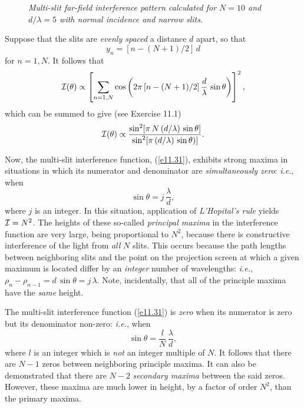 \begin{figure}
\epsfysize=2.5in
\centerline{}
\caption{\em Multi-slit  far-field interference pattern calculated for $N=10$ and $d/\lambda = 5$ with normal
incidence and narrow slits.}\label{f11.8}   
\end{figure}

Suppose that the slits are {\em evenly spaced}\/ a distance $d$ apart, so that
\begin{equation}
y_n = [n-(N+1)/2]\,d
\end{equation}
for $n=1,N$. It follows that
\begin{equation}
{\cal I}(\theta) \propto  \left[\sum_{n=1,N} \cos\left(2\pi\,[n-(N+1)/2]\,\frac{d}{\lambda}\,\sin\theta\right)\right]^2,
\end{equation}
which can be summed to give (see Exercise 11.1)
\begin{equation}\label{e11.31}
{\cal I}(\theta)\propto \frac{\sin^2[\pi\,N\,(d/\lambda)\,\sin\theta]}{\sin^2[\pi\,(d/\lambda)\,\sin\theta)]}.
\end{equation}

Now, the multi-slit interference function, (\ref{e11.31}), exhibits  strong maxima in situations in which
its numerator and  denominator are {\em simultaneously zero}: {\em i.e.}, when 
\begin{equation}\label{e11.31a}
\sin\theta=j\,\frac{\lambda}{d},
\end{equation}
 where
$j$ is an integer. In this situation, application of {\em L'Hopital's rule}\/ yields ${\cal I} = N^2$. The
heights of these so-called {\em principal maxima}\/ in the interference function are very large, being proportional to $N^2$, because  
 there is constructive
interference of the light from {\em all}\/ $N$ slits. This occurs because the path lengths between neighboring
slits and the point on the projection screen at which a given maximum is located differ by an {\em integer}\/ number of wavelengths: {\em i.e.},
$\rho_n-\rho_{n-1}=d\,\sin\theta=j\,\lambda$. Note, incidentally, that all of the principle maxima have the {\em same}\/ height. 

The multi-slit interference function (\ref{e11.31}) is  {\em zero}\/ when
its numerator is zero but its denominator  non-zero: {\em i.e.}, when 
\begin{equation}\label{e11.31b}
\sin\theta=\frac{l}{N}\,\frac{\lambda}{d},
\end{equation}
 where
$l$ is an integer which is {\em not}\/ an integer multiple of $N$. It follows that there are $N-1$ zeros between neighboring
principle maxima. It can also be demonstrated that there are $N-2$ {\em secondary maxima}\/ between
the said zeros. However, these maxima are much lower in height, by a factor of order $N^2$,  than the primary maxima.

